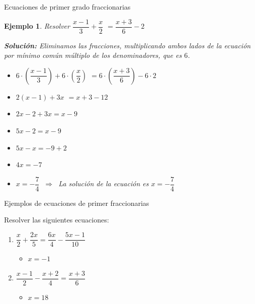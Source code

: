 \documentclass[10pt]{beamer}
\newtheorem{ejemplo}{Ejemplo}
\begin{document}
\begin{frame}{Ecuaciones de primer grado fraccionarias}

\begin{ejemplo}
	Resolver $\dfrac{x-1}{3}+\dfrac{x}{2}$ $=\dfrac{x+3}{6}-2$
	
	\textbf{Solución: }Eliminamos las fracciones, multiplicando ambos lados
	de la ecuación por mínimo común múltiplo de los
	denominadores, que es $6$.
	
	\begin{itemize}
		\item $6\cdot \left( \dfrac{x-1}{3}\right) +6\cdot \left( \dfrac{x}{2}%
		\right) $ $=6\cdot \left( \dfrac{x+3}{6}\right) -6\cdot 2$
		
		\item $2(x-1)+3x$ $=x+3-12$
		
		\item $2x-2+3x=x-9$
		
		\item $5x-2=x-9$
		
		\item $5x-x=-9+2$
		
		\item $4x=-7$
		
		\item $x=-\dfrac{7}{4}$ $\ \Longrightarrow $ $\ $La solución de la 
		ecuación es $x=-\dfrac{7}{4}$
	\end{itemize}
\end{ejemplo}

\end{frame}%

\begin{frame}{Ejemplos de ecuaciones de primer fraccionarias}

Resolver las siguientes ecuaciones:

\begin{enumerate}
	\item $\dfrac{x}{2}+\dfrac{2x}{5}=\dfrac{6x}{4}-\dfrac{5x-1}{10}$
	
	\begin{itemize}
		\item $x=-1$
	\end{itemize}
	
	\item $\dfrac{x-1}{2}-\dfrac{x+2}{4}=\dfrac{x+3}{6}$
	
	\begin{itemize}
		\item $x=18$
	\end{itemize}
\end{enumerate}

\end{frame}%
\end{document}
